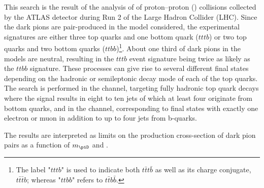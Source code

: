 This search is the result of the analysis of \lumi of proton–proton (\pp) collisions collected by the ATLAS detector during Run 2 of the Large Hadron Collider (LHC).  Since the dark pions are pair-produced in the model considered, the experimental signatures are either three top quarks and one bottom quark ($tttb$) or two top quarks and two bottom quarks ($ttbb$)\footnote{The label "$tttb$" is used to indicate both $t\bar{t}t\bar{b}$ as well as its charge conjugate, $t\bar{t}\bar{t}b$; whereas "$ttbb$" refers to $t\bar{t}b\bar{b}$.}. About one third of dark pions in the \sul models are neutral, resulting in the $tttb$ event signature being twice as likely as the $ttbb$ signature. These processes can give rise to several different final states depending on the hadronic
or semileptonic decay mode of each of the top quarks. 
The search is performed in the \emph{\allhad} channel, targeting fully hadronic top quark decays where the signal results in eight to ten jets of which at least four originate from bottom quarks, and in the \emph{\onelep} channel, corresponding to final states with exactly one electron or muon in addition to up to four jets from b-quarks.

The results are interpreted as limits on the production cross-section of dark pion pairs as a function of $m_{\piD}$ and \etaD.


